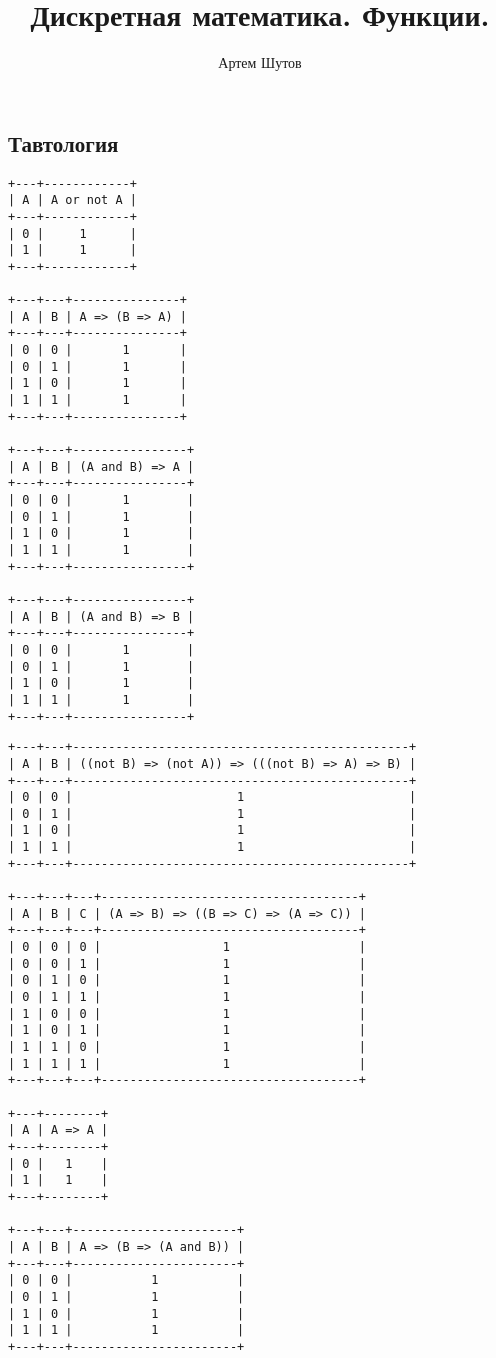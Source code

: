 \documentclass{article}
\title{Дискретная математика. Функции.}
\author{Артем Шутов}
\date{}
\begin{document}
\maketitle
	
\begin{center}
\subsection*{Тавтология}
\end{center}
	
\begin{verbatim}
+---+------------+
| A | A or not A |
+---+------------+
| 0 |     1      |
| 1 |     1      |
+---+------------+

+---+---+---------------+
| A | B | A => (B => A) |
+---+---+---------------+
| 0 | 0 |       1       |
| 0 | 1 |       1       |
| 1 | 0 |       1       |
| 1 | 1 |       1       |
+---+---+---------------+

+---+---+----------------+
| A | B | (A and B) => A |
+---+---+----------------+
| 0 | 0 |       1        |
| 0 | 1 |       1        |
| 1 | 0 |       1        |
| 1 | 1 |       1        |
+---+---+----------------+

+---+---+----------------+
| A | B | (A and B) => B |
+---+---+----------------+
| 0 | 0 |       1        |
| 0 | 1 |       1        |
| 1 | 0 |       1        |
| 1 | 1 |       1        |
+---+---+----------------+
\end{verbatim}
\newpage

\begin{verbatim}
+---+---+-----------------------------------------------+
| A | B | ((not B) => (not A)) => (((not B) => A) => B) |
+---+---+-----------------------------------------------+
| 0 | 0 |                       1                       |
| 0 | 1 |                       1                       |
| 1 | 0 |                       1                       |
| 1 | 1 |                       1                       |
+---+---+-----------------------------------------------+

+---+---+---+------------------------------------+
| A | B | C | (A => B) => ((B => C) => (A => C)) |
+---+---+---+------------------------------------+
| 0 | 0 | 0 |                 1                  |
| 0 | 0 | 1 |                 1                  |
| 0 | 1 | 0 |                 1                  |
| 0 | 1 | 1 |                 1                  |
| 1 | 0 | 0 |                 1                  |
| 1 | 0 | 1 |                 1                  |
| 1 | 1 | 0 |                 1                  |
| 1 | 1 | 1 |                 1                  |
+---+---+---+------------------------------------+

+---+--------+
| A | A => A |
+---+--------+
| 0 |   1    |
| 1 |   1    |
+---+--------+

+---+---+-----------------------+
| A | B | A => (B => (A and B)) |
+---+---+-----------------------+
| 0 | 0 |           1           |
| 0 | 1 |           1           |
| 1 | 0 |           1           |
| 1 | 1 |           1           |
+---+---+-----------------------+

\end{verbatim}
\end{document}
